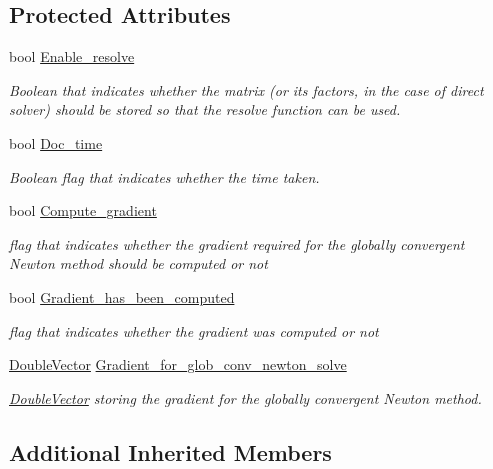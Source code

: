 \subsection*{Protected Attributes}
\begin{DoxyCompactItemize}
\item 
bool \hyperlink{classoomph_1_1LinearSolver_a5f5e7e7a44ff0897b0e4cd9524000edc}{Enable\+\_\+resolve}
\begin{DoxyCompactList}\small\item\em Boolean that indicates whether the matrix (or its factors, in the case of direct solver) should be stored so that the resolve function can be used. \end{DoxyCompactList}\item 
bool \hyperlink{classoomph_1_1LinearSolver_a536e41b50b3f3464ca9cb4a5776acc19}{Doc\+\_\+time}
\begin{DoxyCompactList}\small\item\em Boolean flag that indicates whether the time taken. \end{DoxyCompactList}\item 
bool \hyperlink{classoomph_1_1LinearSolver_aef857e4c0c16e8b342a14493e558bb15}{Compute\+\_\+gradient}
\begin{DoxyCompactList}\small\item\em flag that indicates whether the gradient required for the globally convergent Newton method should be computed or not \end{DoxyCompactList}\item 
bool \hyperlink{classoomph_1_1LinearSolver_a9fd3bf9a5a94dcc23b7d903f99535e72}{Gradient\+\_\+has\+\_\+been\+\_\+computed}
\begin{DoxyCompactList}\small\item\em flag that indicates whether the gradient was computed or not \end{DoxyCompactList}\item 
\hyperlink{classoomph_1_1DoubleVector}{Double\+Vector} \hyperlink{classoomph_1_1LinearSolver_ad38255ae12611787a857cc5c90ffa9f8}{Gradient\+\_\+for\+\_\+glob\+\_\+conv\+\_\+newton\+\_\+solve}
\begin{DoxyCompactList}\small\item\em \hyperlink{classoomph_1_1DoubleVector}{Double\+Vector} storing the gradient for the globally convergent Newton method. \end{DoxyCompactList}\end{DoxyCompactItemize}
\subsection*{Additional Inherited Members}



